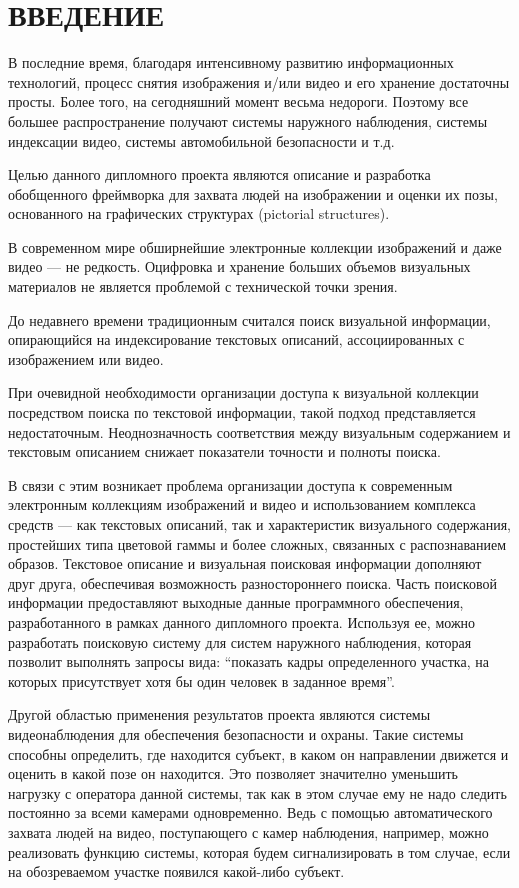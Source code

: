 \section*{ВВЕДЕНИЕ}

В последние время, благодаря интенсивному развитию информационных технологий, процесс снятия изображения и/или видео и его хранение достаточны просты. Более того, на сегодняшний момент весьма недороги. Поэтому все большее распространение получают системы наружного наблюдения, системы индексации видео, системы автомобильной безопасности и т.д.

Целью данного дипломного проекта являются описание и разработка обобщенного фреймворка для захвата людей на изображении и оценки их позы, основанного на графических структурах (pictorial structures).

В современном мире обширнейшие электронные коллекции изображений и даже видео --- не редкость. Оцифровка и хранение больших объемов визуальных материалов не является проблемой с технической точки зрения.

До недавнего времени традиционным считался поиск визуальной информации, опирающийся на индексирование текстовых описаний, ассоциированных с изображением или видео.

При очевидной необходимости организации доступа к визуальной коллекции посредством поиска по текстовой информации, такой подход представляется недостаточным. Неоднозначность соответствия между визуальным содержанием и текстовым описанием снижает показатели точности и полноты поиска.

В связи с этим возникает проблема организации доступа к современным электронным коллекциям изображений и видео и использованием комплекса средств --- как текстовых описаний, так и характеристик визуального содержания, простейших типа цветовой гаммы и более сложных, связанных с распознаванием образов. Текстовое описание и визуальная поисковая информации дополняют друг друга, обеспечивая возможность разностороннего поиска. Часть поисковой информации предоставляют выходные данные программного обеспечения, разработанного в рамках данного дипломного проекта. Используя ее, можно разработать поисковую систему для систем наружного наблюдения, которая позволит выполнять запросы вида: ``показать кадры определенного участка, на которых присутствует хотя бы один человек в заданное время''.

Другой областью применения результатов проекта являются системы видеонаблюдения для обеспечения безопасности и охраны. Такие системы способны определить, где находится субъект, в каком он направлении движется и оценить в какой позе он находится. Это позволяет значително уменьшить нагрузку с оператора данной системы, так как в этом случае ему не надо следить постоянно за всеми камерами одновременно. Ведь с помощью автоматического захвата людей на видео, поступающего с камер наблюдения, например, можно реализовать функцию системы, которая будем сигнализировать в том случае, если на обозреваемом участке появился какой-либо субъект.

